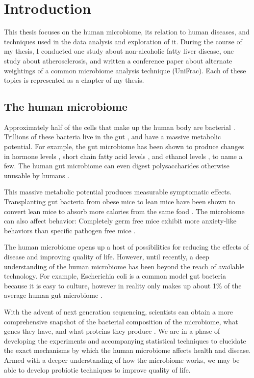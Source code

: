 \chapter{Introduction}
This thesis focuses on the human microbiome, its relation to human diseases, and techniques used in the data analysis and exploration of it. During the course of my thesis, I conducted one study about non-alcoholic fatty liver disease, one study about atherosclerosis, and written a conference paper about alternate weightings of a common microbiome analysis technique (UniFrac). Each of these topics is represented as a chapter of my thesis.

\section{The human microbiome}
Approximately half of the cells that make up the human body are bacterial \cite{sender2016revised}. Trillions of these bacteria live in the gut \cite{guarner2003gut}, and have a massive metabolic potential. For example, the gut microbiome has been shown to produce changes in hormone levels \cite{markle2013sex}, short chain fatty acid levels \cite{turnbaugh2008diet}, and ethanol levels \cite{krebs1970physiological}, to name a few. The human gut microbiome can even digest polysaccharides otherwise unusable by humans \cite{flint2008polysaccharide}.

This massive metabolic potential produces measurable symptomatic effects. Transplanting gut bacteria from obese mice to lean mice have been shown to convert lean mice to absorb more calories from the same food \cite{turnbaugh2006obesity}. The microbiome can also affect behavior: Completely germ free mice exhibit more anxiety-like behaviors than specific pathogen free mice \cite{neufeld2011reduced}.

The human microbiome opens up a host of possibilities for reducing the effects of disease and improving quality of life. However, until recently, a deep understanding of the human microbiome has been beyond the reach of available technology. For example, Escherichia coli is a common model gut bacteria because it is easy to culture, however in reality only makes up about 1\% of the average human gut microbiome \cite{arumugam2011enterotypes}.

With the advent of next generation sequencing, scientists can obtain a more comprehensive snapshot of the bacterial composition of the microbiome, what genes they have, and what proteins they produce \cite{di2013high}. We are in a phase of developing the experiments and accompanying statistical techniques to elucidate the exact mechanisms by which the human microbiome affects health and disease. Armed with a deeper understanding of how the microbiome works, we may be able to develop probiotic techniques to improve quality of life.

